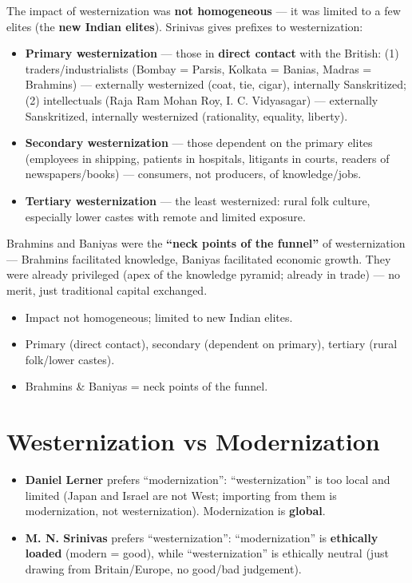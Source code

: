 The impact of westernization was \textbf{not homogeneous} --- it was limited to a few elites (the \textbf{new Indian elites}). Srinivas gives prefixes to westernization:
\begin{itemize}
\item \textbf{Primary westernization} --- those in \textbf{direct contact} with the British: (1) traders/industrialists (Bombay = Parsis, Kolkata = Banias, Madras = Brahmins) --- externally westernized (coat, tie, cigar), internally Sanskritized; (2) intellectuals (Raja Ram Mohan Roy, I. C. Vidyasagar) --- externally Sanskritized, internally westernized (rationality, equality, liberty).
\item \textbf{Secondary westernization} --- those dependent on the primary elites (employees in shipping, patients in hospitals, litigants in courts, readers of newspapers/books) --- consumers, not producers, of knowledge/jobs.
\item \textbf{Tertiary westernization} --- the least westernized: rural folk culture, especially lower castes with remote and limited exposure.
\end{itemize}

\begin{KeyConcept}
Brahmins and Baniyas were the \textbf{``neck points of the funnel''} of westernization --- Brahmins facilitated knowledge, Baniyas facilitated economic growth. They were already privileged (apex of the knowledge pyramid; already in trade) --- no merit, just traditional capital exchanged.
\end{KeyConcept}

\begin{QuickRevision}
\begin{itemize}
\item Impact not homogeneous; limited to new Indian elites.
\item Primary (direct contact), secondary (dependent on primary), tertiary (rural folk/lower castes).
\item Brahmins \& Baniyas = neck points of the funnel.
\end{itemize}
\end{QuickRevision}

\section{Westernization vs Modernization}

\begin{ComparisonBox}
\begin{itemize}
\item \textbf{Daniel Lerner} prefers ``modernization'': ``westernization'' is too local and limited (Japan and Israel are not West; importing from them is modernization, not westernization). Modernization is \textbf{global}.
\item \textbf{M. N. Srinivas} prefers ``westernization'': ``modernization'' is \textbf{ethically loaded} (modern = good), while ``westernization'' is ethically neutral (just drawing from Britain/Europe, no good/bad judgement).
\end{itemize}
\end{ComparisonBox}

